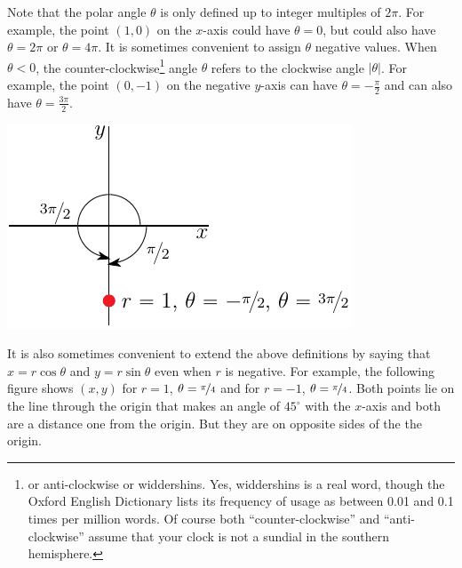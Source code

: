 Note that the polar angle $\theta$ is only defined up to integer multiples
of $2\pi$. For example, the point $(1,0)$ on the $x$-axis could have 
$\theta=0$, but could also have $\theta=2\pi$ or $\theta=4\pi$. It is sometimes
convenient to assign $\theta$ negative values. When $\theta<0$, the
counter-clockwise\footnote{or anti-clockwise or widdershins.
Yes, widdershins is a real word, though the Oxford English Dictionary
lists its frequency of usage as between 0.01 and 0.1 times
per million words. Of course both ``counter-clockwise''
and ``anti-clockwise'' assume that your clock is not a sundial in the
southern hemisphere.} 
angle $\theta$ refers to the clockwise angle $|\theta|$. For example,
the point $(0,-1)$ on the negative $y$-axis can have $\theta=-\frac{\pi}{2}$
and can also have $\theta=\frac{3\pi}{2}$.\begin{efig}
\begin{center}
    \includegraphics{polarNegTh.pdf}
\end{center}
\end{efig}



It is also sometimes convenient to extend the above definitions by saying that
$x=r\cos\theta$ and $y=r\sin\theta$ even when $r$ is negative. For example,
the following figure shows $(x,y)$ for $r=1$, $\theta=\nicefrac{\pi}{4}$
and for $r=-1$, $\theta=\nicefrac{\pi}{4}$.
Both points lie on the  line through the origin that makes an angle of
$45^\circ$ with the $x$-axis and both are a distance one from the origin.
But they are on opposite sides of the the origin.


